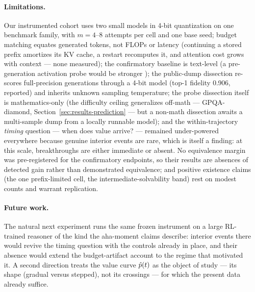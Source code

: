 \paragraph{Limitations.}
Our instrumented cohort uses two small models in 4-bit quantization on one
benchmark family, with $m = 4$--$8$ attempts per cell and one base seed;
budget matching equates generated tokens, not FLOPs or latency
(continuing a stored prefix amortizes its KV cache, a restart recomputes
it, and attention cost grows with context --- none measured);
the confirmatory baseline is text-level (a pre-generation activation probe
would be stronger \citep{lugoloobi2026}); the public-dump dissection
re-scores full-precision generations through a 4-bit model (top-1 fidelity
0.906, reported) and inherits unknown sampling temperature; the probe
dissection itself is mathematics-only (the difficulty ceiling generalizes
off-math --- GPQA-diamond, Section~\ref{sec:results-prediction} --- but a
non-math dissection awaits a multi-sample dump from a locally runnable
model); and the
within-trajectory \emph{timing} question --- when does value arrive? ---
remained under-powered everywhere because genuine interior events are
rare, which is itself a finding: at this scale, breakthroughs are either
immediate or absent. No equivalence margin was pre-registered for the
confirmatory endpoints,
so their results are absences of detected gain rather than demonstrated
equivalence; and positive existence claims (the one prefix-limited cell,
the intermediate-solvability band) rest on modest counts and warrant
replication.

\paragraph{Future work.}
The natural next experiment runs the same frozen instrument on a
large RL-trained reasoner of the kind the aha-moment claims describe: interior
events there would revive the timing question with the controls already in
place, and their absence would extend the budget-artifact account to the
regime that motivated it. A second direction treats the value curve
$\hat{p}(t)$ as the object of study --- its shape (gradual versus stepped),
not its crossings --- for which the present data already suffice.
